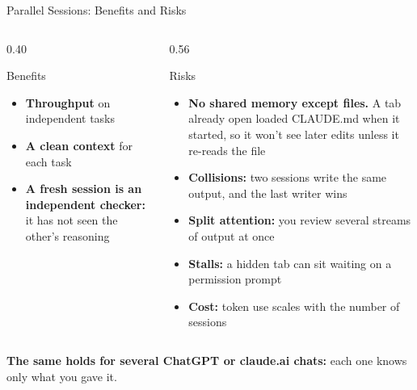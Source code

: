 \documentclass[aspectratio=169, 11pt]{beamer}
\begin{document}
\begin{frame}{Parallel Sessions: Benefits and Risks}
  \small
  \begin{columns}[T]
    \begin{column}{0.40\textwidth}
      \begin{block}{Benefits}
        \begin{itemize}
          \item \textbf{Throughput} on independent tasks
          \item \textbf{A clean context} for each task
          \item \textbf{A fresh session is an independent checker:} it has not seen the other's reasoning
        \end{itemize}
      \end{block}
    \end{column}
    \begin{column}{0.56\textwidth}
      \begin{alertblock}{Risks}
        \begin{itemize}
          \item \textbf{No shared memory except files.} A tab already open loaded CLAUDE.md when it started, so it won't see later edits unless it re-reads the file
          \item \textbf{Collisions:} two sessions write the same output, and the last writer wins
          \item \textbf{Split attention:} you review several streams of output at once
          \item \textbf{Stalls:} a hidden tab can sit waiting on a permission prompt
          \item \textbf{Cost:} token use scales with the number of sessions
        \end{itemize}
      \end{alertblock}
    \end{column}
  \end{columns}

  \vspace{0.6em}
  \textbf{The same holds for several ChatGPT or claude.ai chats:} each one knows only what you gave it.
\end{frame}
\end{document}
